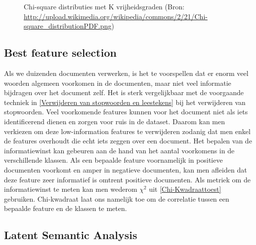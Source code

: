 \begin{figure}[h]%
    \centering
    \caption{Chi-square distributies met K vrijheidsgraden (Bron: \url{http://upload.wikimedia.org/wikipedia/commons/2/21/Chi-square_distributionPDF.png})}%
\end{figure}

\subsection{Best feature selection}\label{Low-information feature el}

Als we duizenden documenten verwerken, is het te voorspellen dat er enorm veel woorden algemeen voorkomen in de documenten, maar niet veel informatie bijdragen over het document zelf. Het is sterk vergelijkbaar met de voorgaande techniek in \ref{Verwijderen van stopwoorden en leestekens} bij het verwijderen van stopwoorden. Veel voorkomende features kunnen voor het document niet als iets identificerend dienen en zorgen voor ruis in de dataset. Daarom kan men verkiezen om deze low-information features te verwijderen zodanig dat men enkel de features overhoudt die echt iets zeggen over een document. Het bepalen van de informatiewinst kan gebeuren aan de hand van het aantal voorkomens in de verschillende klassen. Als een bepaalde feature voornamelijk in positieve documenten voorkomt en amper in negatieve documenten, kan men afleiden dat deze feature zeer informatief is omtrent positieve documenten. Als metriek om de informatiewinst te meten kan men wederom ${\chi}^2$ uit \ref{Chi-Kwadraattoest} gebruiken. Chi-kwadraat laat ons namelijk toe om de correlatie tussen een bepaalde feature en de klassen te meten.
%
\subsection{Latent Semantic Analysis}\label{Latent Semantic Analysis}

